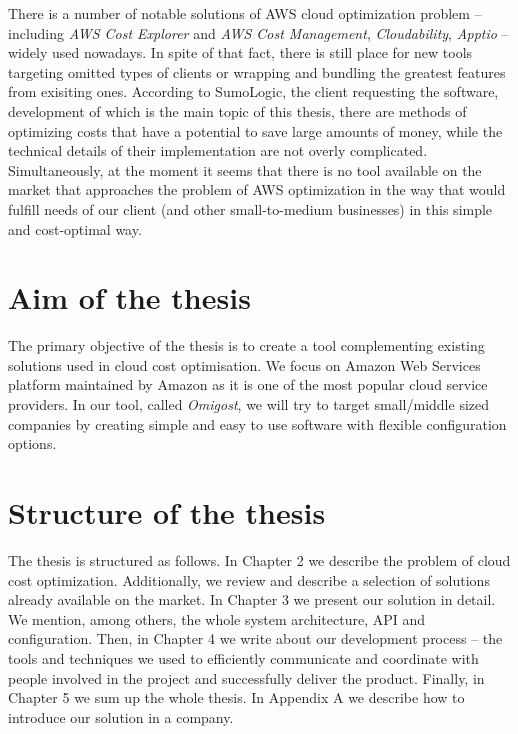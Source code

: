 \documentclass[licencjacka,en]{thesisclass}
\begin{document}
    There is a number of notable solutions of AWS cloud optimization
    problem -- including \textit{AWS Cost Explorer} and \textit{AWS Cost Management},
    \textit{Cloudability}, \textit{Apptio} -- widely used nowadays.
    In spite of that fact, there is still place for new tools targeting
    omitted types of clients or wrapping and bundling the greatest features from exisiting ones.
    According to SumoLogic, the client requesting the software,
    development of which is the main topic of this thesis, there are methods of optimizing costs
    that have a potential to save large amounts of money, while the technical details
    of their implementation are not overly complicated.
    Simultaneously, at the moment it seems that there is
    no tool available on the market that approaches the problem
    of AWS optimization in the way that would fulfill
    needs of our client (and other small-to-medium businesses)
    in this simple and cost-optimal way.

    \section{Aim of the thesis}

    The primary objective of the thesis is to create a tool
    complementing existing solutions used in cloud cost optimisation.
    We focus on Amazon Web Services platform maintained by Amazon
    as it is one of the most popular cloud service providers.
    In our tool, called \textit{Omigost}, we will try to target small/middle
    sized companies by creating simple and easy to use software
    with flexible configuration options.

    \section{Structure of the thesis}

    The thesis is structured as follows.
    In Chapter 2 we describe the problem of cloud cost optimization.
    Additionally, we review and describe a selection of solutions already available
    on the market.
    In Chapter 3 we present our solution in detail.
    We mention, among others, the whole system architecture, API and configuration.
    Then, in Chapter 4 we write about our development process -- the tools and techniques
    we used to efficiently communicate and coordinate with people involved in the project
    and successfully deliver the product.
    Finally, in Chapter 5 we sum up the whole thesis.
    In Appendix A we describe how to introduce our solution in a company.
\end{document}
